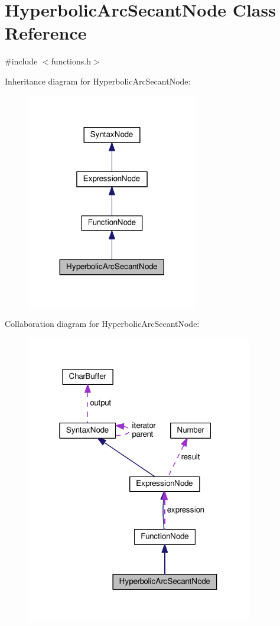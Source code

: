 \hypertarget{classHyperbolicArcSecantNode}{}\section{Hyperbolic\+Arc\+Secant\+Node Class Reference}
\label{classHyperbolicArcSecantNode}


{\ttfamily \#include $<$functions.\+h$>$}



Inheritance diagram for Hyperbolic\+Arc\+Secant\+Node\+:
\nopagebreak
\begin{figure}[H]
\begin{center}
\leavevmode
\includegraphics[width=212pt]{db/d8a/classHyperbolicArcSecantNode__inherit__graph}
\end{center}
\end{figure}


Collaboration diagram for Hyperbolic\+Arc\+Secant\+Node\+:
\nopagebreak
\begin{figure}[H]
\begin{center}
\leavevmode
\includegraphics[width=280pt]{d5/d49/classHyperbolicArcSecantNode__coll__graph}
\end{center}
\end{figure}
